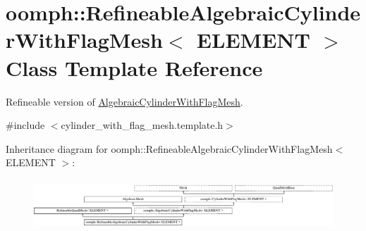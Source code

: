 \hypertarget{classoomph_1_1RefineableAlgebraicCylinderWithFlagMesh}{}\section{oomph\+:\+:Refineable\+Algebraic\+Cylinder\+With\+Flag\+Mesh$<$ E\+L\+E\+M\+E\+NT $>$ Class Template Reference}
\label{classoomph_1_1RefineableAlgebraicCylinderWithFlagMesh}


Refineable version of \hyperlink{classoomph_1_1AlgebraicCylinderWithFlagMesh}{Algebraic\+Cylinder\+With\+Flag\+Mesh}.  




{\ttfamily \#include $<$cylinder\+\_\+with\+\_\+flag\+\_\+mesh.\+template.\+h$>$}

Inheritance diagram for oomph\+:\+:Refineable\+Algebraic\+Cylinder\+With\+Flag\+Mesh$<$ E\+L\+E\+M\+E\+NT $>$\+:\begin{figure}[H]
\begin{center}
\leavevmode
\includegraphics[height=1.924399cm]{classoomph_1_1RefineableAlgebraicCylinderWithFlagMesh}
\end{center}
\end{figure}
